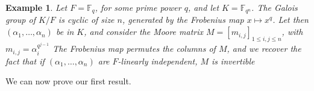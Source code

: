 \documentclass[12pt]{article}
\theoremstyle{plain}
\newtheorem{theorem}{Theorem}
\newtheorem{example}[theorem]{Example}
\newcommand{\F}{\ensuremath{\mathbb{F}}}
\begin{document}
\begin{example}\label{ex:Moore}
  Let $F=\F_q$, for some prime power $q$, and let $K=\F_{q^n}$.  The
  Galois group of $K/F$ is cyclic of size $n$, generated by the Frobenius
  map $x \mapsto x^q$. Let then $(\alpha_1,\dots,\alpha_n)$ be in $K$,
  and consider the {\em Moore matrix} $M=[m_{i,j}]_{1 \le i,j \le n}$, with
  $m_{i,j} = \alpha_i^{q^{j-1}}$ The Frobenius map permutes the
  columns of $M$, and we recover the fact that if
  $(\alpha_1,\dots,\alpha_n)$ are $F$-linearly independent, $M$ is
  invertible~\cite[Corollary~1.3.4]{Goss}
\end{example}


We can now prove our first result.

\end{document}
